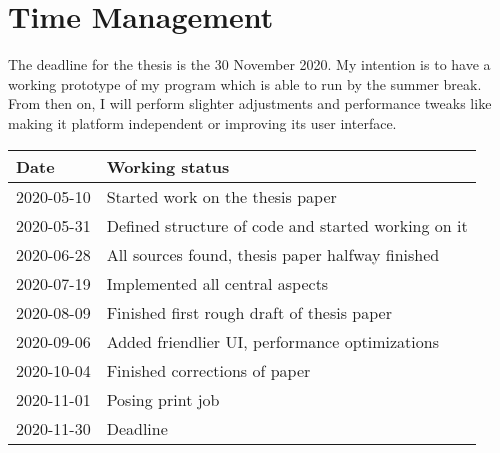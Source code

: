 \documentclass[10pt,a4paper]{article}
\begin{document}
	\section{Time Management}
	The deadline for the thesis is the 30 November 2020. My intention is to have a working prototype of my program which is able to run by the summer break. From then on, I will perform slighter adjustments and performance tweaks like making it platform independent or improving its user interface.
	\begin{table}[h]
		\centering
		\begin{tabular}{l|l}
			Date & Working status \\ \hline
			2020-05-10 & Started work on the thesis paper\\ \hline
			2020-05-31 & Defined structure of code and started working on it \\ \hline
			2020-06-28 & All sources found, thesis paper halfway finished \\ \hline
			2020-07-19 & Implemented all central aspects \\ \hline
			2020-08-09 & Finished first rough draft of thesis paper \\ \hline
			2020-09-06 & Added friendlier UI, performance optimizations \\ \hline
			2020-10-04 & Finished corrections of paper \\ \hline
			2020-11-01 & Posing print job \\ \hline
			2020-11-30 & Deadline \\
		\end{tabular}
	\end{table}
\end{document}
